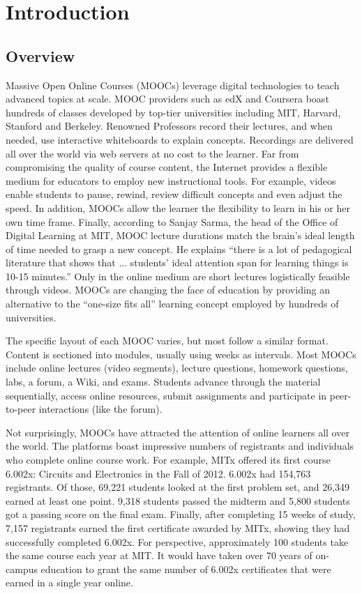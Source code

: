 \chapter{Introduction}

\section{Overview}
Massive Open Online Courses (MOOCs) leverage digital technologies to teach advanced topics at scale. MOOC providers such as edX and Coursera boast hundreds of classes developed by top-tier universities including MIT, Harvard, Stanford and Berkeley. Renowned Professors record their lectures, and when needed, use interactive whiteboards to explain concepts. Recordings are delivered all over the world via web servers at no cost to the learner.
Far from compromising the quality of course content, the Internet provides a flexible medium for educators to employ new instructional tools. For example, videos enable students to pause, rewind, review difficult concepts and even adjust the speed. In addition, MOOCs allow the learner the flexibility to learn in his or her own time frame. Finally, according to Sanjay Sarma, the head of the Office of Digital Learning at MIT, MOOC lecture durations match the brain's ideal length of time needed to grasp a new concept. He explains ``there is a lot of pedagogical literature that shows that ... students' ideal attention span for learning things is 10-15 minutes.'' \cite{sarma} Only in the online medium are short lectures logistically feasible through videos. MOOCs are changing the face of education by providing an alternative to the “one-size fits all” learning concept employed by hundreds of universities.

The specific layout of each MOOC varies, but most follow a similar format. Content is sectioned into modules, usually using weeks as intervals. Most MOOCs include online lectures (video segments), lecture questions, homework questions, labs, a forum, a Wiki, and exams. Students advance through the material sequentially, access online resources, submit assignments and participate in peer-to-peer interactions (like the forum).

Not surprisingly, MOOCs have attracted the attention of online learners all over the world. The platforms boast impressive numbers of registrants and individuals who complete online course work. For example, MITx offered its first course 6.002x: Circuits and Electronics in the Fall of 2012. 6.002x had 154,763 registrants. Of those, 69,221 students looked at the first problem set, and 26,349 earned at least one point. 9,318 students passed the midterm and 5,800 students got a passing score on the final exam. Finally, after completing 15 weeks of study, 7,157 registrants earned the first certificate awarded by MITx, showing they had successfully completed 6.002x. For perspective, approximately 100 students take the same course each year at MIT. It would have taken over 70 years of on-campus education to grant the same number of 6.002x certificates that were earned in a single year online.

